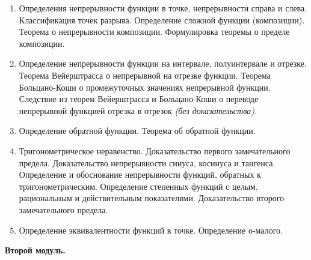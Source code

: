\documentclass[a4paper,12pt]{article}
\begin{document}
\begin{enumerate}
	\item Определения непрерывности функции в точке, непрерывности справа и слева. Классификация точек разрыва. Определение сложной функции (композиции). Теорема о непрерывности композиции. Формулировка теоремы о пределе композиции.
	\item Определение непрерывности функции на интервале, полуинтервале и отрезке. Теорема Вейерштрасса о непрерывной на отрезке функции. Теорема Больцано-Коши о промежуточных значениях непрерывной функции. Следствие из теорем Вейерштрасса и Больцано-Коши о переводе непрерывной функцией отрезка в отрезок \textit{(без доказательства)}.
	\item Определение обратной функции. Теорема об обратной функции.
	\item Тригонометрическое неравенство. Доказательство первого замечательного предела. Доказательство непрерывности синуса, косинуса и тангенса. Определение и обоснование непрерывности функций, обратных к тригонометрическим. Определение степенных функций с целым, рациональным и действительным показателями. Доказательство второго замечательного предела.
	\item Определение эквивалентности функций в точке. Определение о-малого.       
	
\end{enumerate}

\newpage

\begin{center}
	\textbf{Второй модуль.}
\end{center}	 
\end{document}
